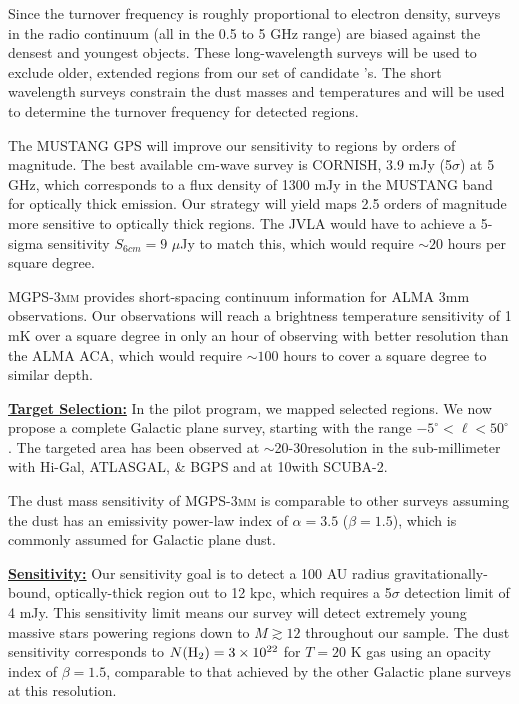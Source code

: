 \documentclass[11pt,preprint]{aastex_nofoot}
\newcommand{\MGPS}{\textsc{MGPS-3mm}\xspace}
\begin{document}
Since the turnover frequency is roughly proportional to electron density,
surveys in the radio continuum (all in the 0.5 to 5 GHz range) are 
biased against the densest and youngest objects.  These long-wavelength surveys
will be used to exclude older, extended \uchii regions from our set of
candidate \hchii's.  The short wavelength surveys constrain the dust masses and
temperatures and will be used to determine the turnover frequency for detected
\hchii regions.

The MUSTANG GPS will improve our sensitivity to \hchii regions by orders of
magnitude. The best available cm-wave survey is CORNISH, 3.9 mJy (5$\sigma$) at 5 GHz, which
corresponds to a flux density of 1300 mJy in the MUSTANG band for optically
thick emission. Our strategy will yield maps 2.5 orders of magnitude more
sensitive to optically thick \hchii regions.  The JVLA would have to achieve a
5-sigma sensitivity $S_{6cm} = 9$ $\mu$Jy to match this, which would require
$\sim20$ hours per square degree.




\MGPS provides short-spacing continuum information for
ALMA 3mm observations.  Our observations will reach a brightness temperature
sensitivity of 1 mK over a square degree in only an hour of observing with
better resolution than the ALMA ACA, which would require $\sim100$ hours to
cover a square degree to similar depth.

\indent\underline{\textbf{\helv Target Selection:}}
In the pilot program, we mapped selected regions.  We now propose a complete
Galactic plane survey, starting with the range $-5^{\circ} < \ell < 50^{\circ}$.
The targeted area has been observed at $\sim$20-30\arcsec resolution in
the sub-millimeter with Hi-Gal, ATLASGAL, \& BGPS and at
10\arcsec with SCUBA-2.  

The dust mass sensitivity of \MGPS is comparable to other surveys assuming the
dust has an emissivity power-law index of $\alpha=3.5$ ($\beta=1.5$), which is 
commonly assumed for Galactic plane
dust.

\indent\underline{\textbf{\helv Sensitivity:}}  Our sensitivity goal is to
detect a 100 AU radius gravitationally-bound, optically-thick \hii region out to 12 kpc, which requires a
5$\sigma$ detection limit of 4 mJy.  This sensitivity limit means our survey
will detect extremely young massive stars powering \hii regions down
to $M \gtrsim 12$ \msun throughout our sample.  The dust sensitivity corresponds to
$N(\textrm{H}_{2})=3\times10^{22}$ \persc for $T=20$ K gas using an opacity index of
$\beta=1.5$, comparable to that achieved by the other Galactic plane surveys at
this resolution.
\end{document}
